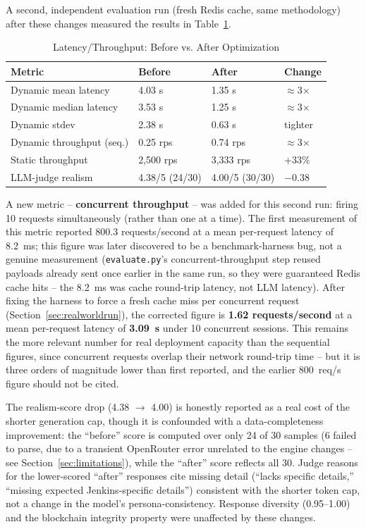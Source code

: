 \documentclass[conference]{IEEEtran}
\begin{document}
A second, independent evaluation run (fresh Redis cache, same methodology)
after these changes measured the results in Table~\ref{tab:optimization}.

\begin{table}[htbp]
\caption{Latency/Throughput: Before vs. After Optimization}
\label{tab:optimization}
\centering
\begin{tabular}{@{}llll@{}}
\toprule
\textbf{Metric} & \textbf{Before} & \textbf{After} & \textbf{Change} \\
\midrule
Dynamic mean latency & 4.03 s & 1.35 s & $\approx$3$\times$ \\
Dynamic median latency & 3.53 s & 1.25 s & $\approx$3$\times$ \\
Dynamic stdev & 2.38 s & 0.63 s & tighter \\
Dynamic throughput (seq.) & 0.25 rps & 0.74 rps & $\approx$3$\times$ \\
Static throughput & 2{,}500 rps & 3{,}333 rps & +33\% \\
LLM-judge realism & 4.38/5 (24/30) & 4.00/5 (30/30) & $-$0.38 \\
\bottomrule
\end{tabular}
\end{table}

A new metric -- \textbf{concurrent throughput} -- was added for this second
run: firing 10 requests simultaneously (rather than one at a time). The
first measurement of this metric reported 800.3 requests/second at a mean
per-request latency of 8.2~ms; this figure was later discovered to be a
benchmark-harness bug, not a genuine measurement (\texttt{evaluate.py}'s
concurrent-throughput step reused payloads already sent once earlier in the
same run, so they were guaranteed Redis cache hits -- the 8.2~ms was cache
round-trip latency, not LLM latency). After fixing the harness to force a
fresh cache miss per concurrent request (Section~\ref{sec:realworldrun}),
the corrected figure is \textbf{1.62 requests/second} at a mean per-request
latency of \textbf{3.09~s} under 10 concurrent sessions. This remains the
more relevant number for real deployment capacity than the sequential
figures, since concurrent requests overlap their network round-trip time --
but it is three orders of magnitude lower than first reported, and the
earlier 800~req/s figure should not be cited.

The realism-score drop (4.38 $\rightarrow$ 4.00) is honestly reported as a
real cost of the shorter generation cap, though it is confounded with a
data-completeness improvement: the ``before'' score is computed over only
24 of 30 samples (6 failed to parse, due to a transient OpenRouter error
unrelated to the engine changes -- see Section~\ref{sec:limitations}),
while the ``after'' score reflects all 30. Judge reasons for the
lower-scored ``after'' responses cite missing detail (``lacks specific
details,'' ``missing expected Jenkins-specific details'') consistent with
the shorter token cap, not a change in the model's persona-consistency.
Response diversity (0.95--1.00) and the blockchain integrity property were
unaffected by these changes.
\end{document}
